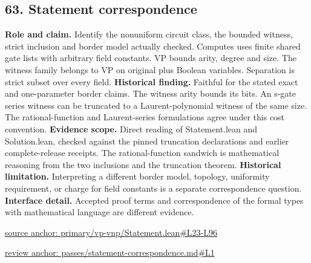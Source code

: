\documentclass[11pt,letterpaper]{article}
\theoremstyle{definition}\newtheorem{definition}[theorem]{Definition}\newtheorem{example}[theorem]{Example}
\theoremstyle{remark}\newtheorem{remark}[theorem]{Remark}
\begin{document}
\subsection*{63. Statement correspondence}
\textbf{Role and claim.} Identify the nonuniform circuit class, the bounded witness, strict inclusion and border model actually checked. Computes uses finite shared gate lists with arbitrary field constants. VP bounds arity, degree and size. The witness family belongs to VP on original plus Boolean variables. Separation is strict subset over every field.
\textbf{Historical finding.} Faithful for the stated exact and one-parameter border claims. The witness arity bounds its bits. An s-gate series witness can be truncated to a Laurent-polynomial witness of the same size. The rational-function and Laurent-series formulations agree under this cost convention.
\textbf{Evidence scope.} Direct reading of Statement.lean and Solution.lean, checked against the pinned truncation declarations and earlier complete-release receipts. The rational-function sandwich is mathematical reasoning from the two inclusions and the truncation theorem.
\textbf{Historical limitation.} Interpreting a different border model, topology, uniformity requirement, or charge for field constants is a separate correspondence question.
\textbf{Interface detail.} Accepted proof terms and correspondence of the formal types with mathematical language are different evidence.
\par\href{https://github.com/nousentllc/VP-VNP-Review/blob/8a7976933b6b2b4ffda1ad3a0dfb5fc6b6f023e8/primary/vp-vnp/Statement.lean\#L23-L96}{source anchor: primary/vp-vnp/Statement.lean\#L23-L96}
\par\href{https://github.com/nousentllc/VP-VNP-Review/blob/8a7976933b6b2b4ffda1ad3a0dfb5fc6b6f023e8/passes/statement-correspondence.md\#L1}{review anchor: passes/statement-correspondence.md\#L1}
\end{document}
